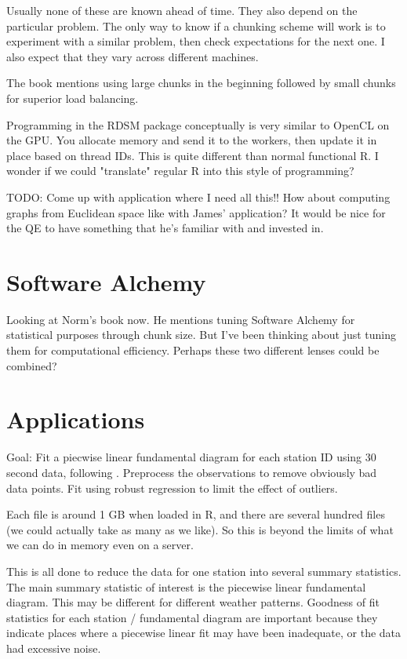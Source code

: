 \documentclass[12pt]{article}
\begin{document}
Usually none of these are known ahead of time.  They also depend on the
particular problem.  The only way to know if a chunking scheme will work is
to experiment with a similar problem, then check expectations for the next
one. I also expect that they vary across different machines.

The book mentions using large chunks in the beginning followed by small
chunks for superior load balancing.

Programming in the RDSM package conceptually is very similar to OpenCL on
the GPU. You allocate memory and send it to the workers, then update it in
place based on thread IDs. This is quite different than normal functional
R. I wonder if we could "translate" regular R into this style of
programming?

TODO: Come up with application where I need all this!! How about computing
graphs from Euclidean space like with James' application? It would be nice
for the QE to have something that he's familiar with and invested in.

\section{Software Alchemy}

Looking at Norm's book now. He mentions tuning Software Alchemy for
statistical purposes through chunk size. But I've been thinking about just
tuning them for computational efficiency. Perhaps these two different
lenses could be combined?

\section{Applications}

Goal: Fit a piecwise linear fundamental diagram for each station ID using
30 second data, following \cite{li2011fundamental}. Preprocess the
observations to remove obviously bad data points.  Fit using robust
regression to limit the effect of outliers.  

Each file is around 1 GB when loaded in R, and there are several hundred
files (we could actually take as many as we like). So this is beyond the
limits of what we can do in memory even on a server.

This is all done to reduce the data for one station into several summary
statistics. The main summary statistic of interest is the piecewise linear
fundamental diagram. This may be different for different weather patterns. 
Goodness of fit statistics for each station / fundamental diagram are
important because they indicate places where a piecewise linear fit may
have been inadequate, or the data had excessive noise.
\end{document}
